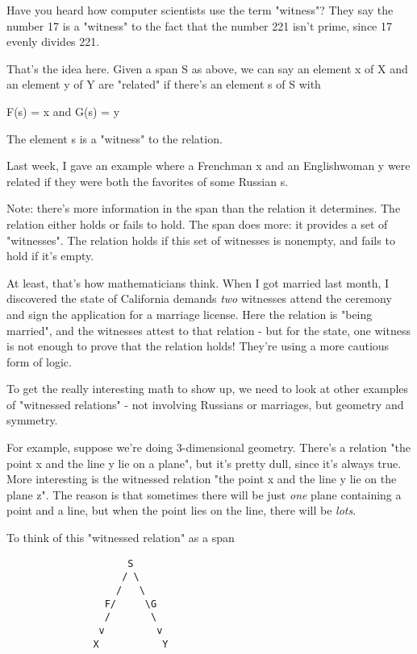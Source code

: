 Have you heard how computer scientists use the term
"witness"?  They say the number 17 is a "witness"
to the fact that the number 221 isn't prime, since 17 evenly divides
221.

That's the idea here.  Given a span S as above, we can say an element
x of X and an element y of Y are "related" if there's an
element s of S with

F(s) = x and G(s) = y

The element s is a "witness" to the relation.  

Last week, I gave an example where a Frenchman x and an Englishwoman y 
were related if they were both the favorites of some Russian s.  

Note: there's more information in the span than the relation it 
determines.  The relation either holds or fails to hold.  The span 
does more: it provides a set of "witnesses".  The relation holds 
if this set of witnesses is nonempty, and fails to hold if it's empty.  

At least, that's how mathematicians think.  When 
I got married last month, I discovered the state of California demands 
\emph{two} witnesses attend the ceremony and sign the application for a 
marriage license.   Here the relation is "being married", and the 
witnesses attest to that relation - but for the state, one witness 
is not enough to prove that the relation holds!  They're using a more 
cautious form of logic.

To get the really interesting math to show up, we need to look at
other examples of "witnessed relations" - not involving Russians
or marriages, but geometry and symmetry.

For example, suppose we're doing 3-dimensional geometry.  There's a
relation "the point x and the line y lie on a plane",
but it's pretty dull, since it's always true.  More interesting is the
witnessed relation "the point x and the line y lie on the plane
z".  The reason is that sometimes there will be just \emph{one} plane
containing a point and a line, but when the point lies on the line,
there will be \emph{lots}.

To think of this "witnessed relation" as a span

\begin{verbatim}
                     S
                    / \
                   /   \
                 F/     \G
                 /       \
                v         v 
               X           Y
\end{verbatim}
    
